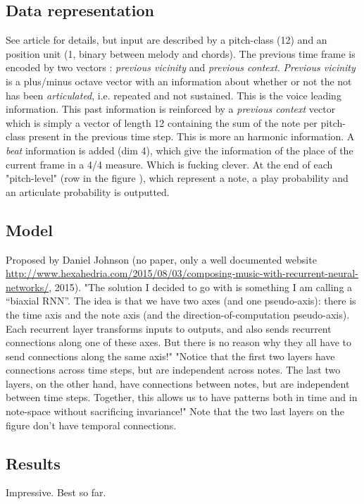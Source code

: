 \documentclass{report}
\begin{document}
\subsection{Data representation}
See article for details, but input are described by a pitch-class (12) and an position unit (1, binary between melody and chords). The previous time frame is encoded by two vectors : \textit{previous vicinity} and \textit{previous context}. \textit{Previous vicinity} is a plus/minus octave vector with an information about whether or not the not has been \textit{articulated}, i.e. repeated and not sustained. This is the voice leading information. This past information is reinforced by a \textit{previous context} vector which is simply a vector of length 12 containing the sum of the note per pitch-class present in the previous time step. This is more an harmonic information.
A \textit{beat} information is added (dim 4), which give the information of the place of the current frame in a 4/4 measure. Which is fucking clever.
At the end of each "pitch-level" (row in the figure ), which represent a note, a play probability and an articulate probability is outputted.

\subsection{Model}
Proposed by Daniel Johnson (no paper, only a well documented website \href{hexadria}{http://www.hexahedria.com/2015/08/03/composing-music-with-recurrent-neural-networks/}, 2015). 
"The solution I decided to go with is something I am calling a “biaxial RNN”. The idea is that we have two axes (and one pseudo-axis): there is the time axis and the note axis (and the direction-of-computation pseudo-axis). Each recurrent layer transforms inputs to outputs, and also sends recurrent connections along one of these axes. But there is no reason why they all have to send connections along the same axis!"
"Notice that the first two layers have connections across time steps, but are independent across notes. The last two layers, on the other hand, have connections between notes, but are independent between time steps. Together, this allows us to have patterns both in time and in note-space without sacrificing invariance!"
Note that the two last layers on the figure don't have temporal connections.

\subsection{Results}
Impressive. Best so far.
\end{document}
